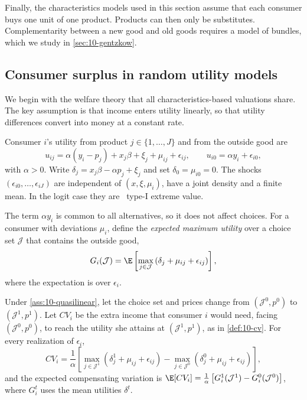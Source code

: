 Finally, the characteristics models used in this section assume that each consumer buys one unit of one product.
Products can then only be substitutes. Complementarity between a new good and old goods requires a model of
bundles, which we study in \cref{sec:10-gentzkow}.

\subsection{Consumer surplus in random utility models}\label{sec:10-cs-welfare}

We begin with the welfare theory that all characteristics-based valuations share. The key assumption is that
income enters utility linearly, so that utility differences convert into money at a constant rate.

\begin{assumption}\label{ass:10-quasilinear}
Consumer $i$'s utility from product $j\in\{1,\dots,J\}$ and from the outside good are
\begin{equation}\label{eq:10-quasilinear}
u_{ij} = \alpha(y_i - p_j) + x_j\beta + \xi_j + \mu_{ij} + \epsilon_{ij},
\qquad
u_{i0} = \alpha y_i + \epsilon_{i0},
\end{equation}
with $\alpha > 0$. Write $\delta_j = x_j\beta - \alpha p_j + \xi_j$ and set $\delta_0 = \mu_{i0} = 0$. The shocks
$(\epsilon_{i0},\dots,\epsilon_{iJ})$ are independent of $(x,\xi,\mu_i)$, have a joint density and a finite mean.
In the logit case they are \iid\ type-I extreme value.
\end{assumption}

The term $\alpha y_i$ is common to all alternatives, so it does not affect choices. For a consumer with deviations
$\mu_i$, define the \emph{expected maximum utility} over a choice set $\mathcal{J}$ that contains the outside good,
\begin{equation}\label{eq:10-emax}
G_i(\mathcal{J}) = \E\left[\max_{j\in\mathcal{J}}\left(\delta_j + \mu_{ij} + \epsilon_{ij}\right)\right],
\end{equation}
where the expectation is over $\epsilon_i$.

\begin{lemma}\label{lem:10-cv-quasilinear}
Under \cref{ass:10-quasilinear}, let the choice set and prices change from $(\mathcal{J}^0,p^0)$ to
$(\mathcal{J}^1,p^1)$. Let $CV_i$ be the extra income that consumer $i$ would need, facing $(\mathcal{J}^0,p^0)$, to
reach the utility she attains at $(\mathcal{J}^1,p^1)$, as in \cref{def:10-cv}. For every realization of $\epsilon_i$,
\begin{equation}\label{eq:10-cv-draw}
CV_i = \frac{1}{\alpha}\left[\max_{j\in\mathcal{J}^1}\left(\delta^1_j + \mu_{ij} + \epsilon_{ij}\right)
- \max_{j\in\mathcal{J}^0}\left(\delta^0_j + \mu_{ij} + \epsilon_{ij}\right)\right],
\end{equation}
and the expected compensating variation is $\E[CV_i] = \frac{1}{\alpha}\left[G^1_i(\mathcal{J}^1) -
G^0_i(\mathcal{J}^0)\right]$, where $G^t_i$ uses the mean utilities $\delta^t$.
\end{lemma}


